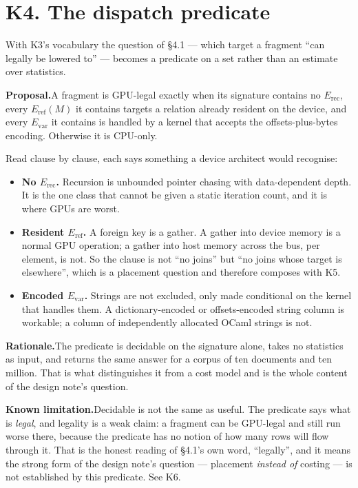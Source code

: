 \documentclass[11pt,a4paper]{article}
\newcommand{\rationale}[1]{%
  \par\noindent\textbf{Rationale.}\quad #1\par\medskip}
\newcommand{\limitation}[1]{%
  \par\noindent\textbf{Known limitation.}\quad #1\par\medskip}
\newcommand{\proposal}[1]{%
  \par\medskip\noindent\textcolor{open}{\textbf{Proposal.}}\quad #1\par\medskip}
\begin{document}
\section{K4. The dispatch predicate}

With K3's vocabulary the question of §4.1 --- which target a fragment ``can
legally be lowered to'' --- becomes a predicate on a set rather than an
estimate over statistics.

\proposal{A fragment is GPU-legal exactly when its signature contains no
$E_{\mathrm{rec}}$, every $E_{\mathrm{ref}}(M)$ it contains targets a relation
already resident on the device, and every $E_{\mathrm{var}}$ it contains is
handled by a kernel that accepts the offsets-plus-bytes encoding. Otherwise it
is CPU-only.}

Read clause by clause, each says something a device architect would recognise:

\begin{itemize}
  \item \textbf{No $E_{\mathrm{rec}}$.} Recursion is unbounded pointer
        chasing with data-dependent depth. It is the one class that cannot be
        given a static iteration count, and it is where GPUs are worst.
  \item \textbf{Resident $E_{\mathrm{ref}}$.} A foreign key is a gather. A
        gather into device memory is a normal GPU operation; a gather into
        host memory across the bus, per element, is not. So the clause is not
        ``no joins'' but ``no joins whose target is elsewhere'', which is a
        placement question and therefore composes with K5.
  \item \textbf{Encoded $E_{\mathrm{var}}$.} Strings are not excluded, only
        made conditional on the kernel that handles them. A dictionary-encoded
        or offsets-encoded string column is workable; a column of independently
        allocated OCaml strings is not.
\end{itemize}

\rationale{The predicate is decidable on the signature alone, takes no
statistics as input, and returns the same answer for a corpus of ten documents
and ten million. That is what distinguishes it from a cost model and is the
whole content of the design note's question.}

\limitation{Decidable is not the same as useful. The predicate says what is
\emph{legal}, and legality is a weak claim: a fragment can be GPU-legal and
still run worse there, because the predicate has no notion of how many rows
will flow through it. That is the honest reading of §4.1's own word,
``legally'', and it means the strong form of the design note's question ---
placement \emph{instead of} costing --- is not established by this predicate.
See K6.}
\end{document}

